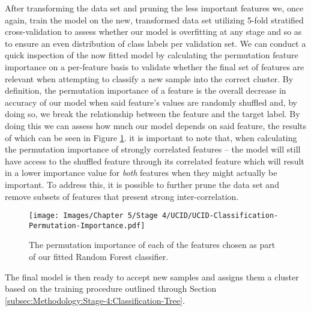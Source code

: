 \noindent \newline After transforming the data set and pruning the less important features we, once again, train the model on the new, transformed data set utilizing 5-fold stratified cross-validation to assess whether our model is overfitting at any stage and so as to ensure an even distribution of class labels per validation set. We can conduct a quick inspection of the now fitted model by calculating the permutation feature importance on a per-feature basis to validate whether the final set of features are relevant when attempting to classify a new sample into the correct cluster. By definition, the permutation importance of a feature is the overall decrease in accuracy of our model when said feature's values are randomly shuffled and, by doing so, we break the relationship between the feature and the target label. By doing this we can assess how much our model depends on said feature, the results of which can be seen in Figure \ref{fig:UCID-Classification-Permutation-Feature-Importance}. it is important to note that, when calculating the permutation importance of strongly correlated features -- the model will still have access to the shuffled feature through its correlated feature which will result in a lower importance value for \textit{both} features when they might actually be important. To address this, it is possible to further prune the data set and remove subsets of features that present strong inter-correlation.

\begin{figure}[H]
    \centering
    \texttt{[image: Images/Chapter 5/Stage 4/UCID/UCID-Classification-Permutation-Importance.pdf]}
    \caption{The permutation importance of each of the features chosen as part of our fitted Random Forest classifier.}
    \label{fig:UCID-Classification-Permutation-Feature-Importance}
\end{figure}

\noindent \newline The final model is then ready to accept new samples and assigns them a cluster based on the training procedure outlined through Section \ref{subsec:Methodology:Stage-4:Classification-Tree}.


